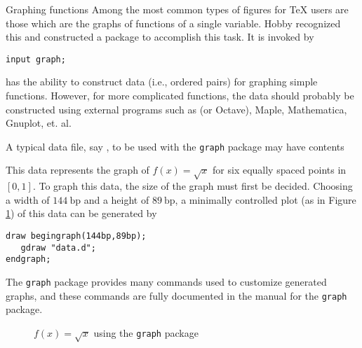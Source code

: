 \begin{section}{Graphing functions}
Among the most common types of figures for \TeX{} users are those which are the graphs of functions of a single variable.  Hobby recognized this and constructed a package to accomplish this task.  It is invoked by
\begin{lstlisting}[xleftmargin=80bp]
input graph;
\end{lstlisting}
\MP{} has the ability to construct data (i.e., ordered pairs) for graphing simple functions.  However, for more complicated functions, the data should probably be constructed using external programs such as  (or Octave), Maple, Mathematica, Gnuplot, et. al.

A typical data file, say , to be used with the \texttt{graph} package may have contents

This data represents the graph of $f(x)=\sqrt{x}$ for six equally spaced points in $[0,1]$.  To graph this data, the size of the graph must first be decided.  Choosing a width of $144\mathrm{\ bp}$ and a height of $89\mathrm{\ bp}$, a minimally controlled plot (as in Figure \ref{fig:data}) of this data can be generated by
\begin{lstlisting}[xleftmargin=38bp]
draw begingraph(144bp,89bp);
   gdraw "data.d";
endgraph;
\end{lstlisting}
The \texttt{graph} package provides many commands used to customize generated graphs, and these commands are fully documented in the manual \cite{hobby:graph} for the \texttt{graph} package.
\begin{figure}[hptb]
   \begin{center}\end{center}
   \caption{$f(x)=\sqrt{x}$ using the \texttt{graph} package}\label{fig:data}
\end{figure}
\end{section}

